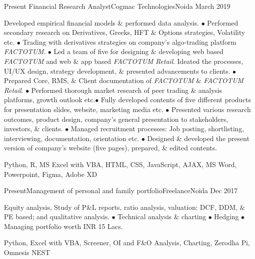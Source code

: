 %
%
%
\begin{experiences}
  \experience
    {Present}   {Financial Research Analyst}{Cogmac Technologies}{Noida}
    {March 2019}
    {
\begin{description}
Developed empirical financial models \& performed data analysis. $\bullet$ Performed secondary research on Derivatives, Greeks, HFT \& Options strategies, Volatility etc. $\bullet$ Trading with derivatives strategies on company’s algo-trading platform \textit{FACTOTUM}. $\bullet$ Led a team of five for designing \& developing web based \textit{FACTOTUM} and web \& app based \textit{FACTOTUM Retail}. Ideated the processes, UI/UX design, strategy development, \& presented advancements to clients. $\bullet$ Prepared Core, RMS, \& Client documentation of \textit{FACTOTUM} \& \textit{FACTOTUM Retail}. $\bullet$ Performed thorough market research of peer trading \& analysis platforms, growth outlook etc.$\bullet$ Fully developed contents of five different products for presentation slides, website, marketing media etc. $\bullet$ Presented various research outcomes, product design, company's general presentation to stakeholders, investors, \& clients. $\bullet$ Managed recruitment processes: Job posting, shortlisting, interviewing, documentation, orientation etc. $\bullet$ Designed \& developed the present version of company's website (five pages), prepared, \& edited contents.
\end{description}
}
        {Python, R, MS Excel with VBA, HTML, CSS, JavaScript, AJAX, MS Word, Powerpoint, Figma, Adobe XD}
\end{experiences}


\begin{experiences}
   \experience
    {Present}{Management of personal and family portfolio}{Freelance}{Noida}
    {Dec 2017}
    {
\begin{description}
        Equity analysis, Study of P\&L reports, ratio analysis, valuation: DCF, DDM, \& PE based; and qualitative analysis. $\bullet$ Technical analysis \& charting $\bullet$ Hedging $\bullet$ Managing portfolio worth INR 15 Lacs.
    \end{description}
    }
        {Python, Excel with VBA, Screener, OI and F\&O Analysis, Charting, Zerodha Pi, Omnesis NEST}
\end{experiences}

